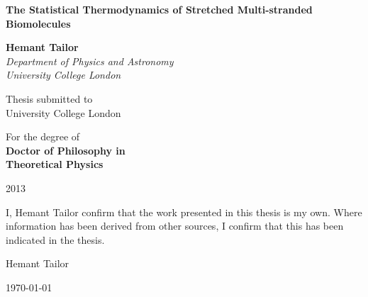 \documentclass[a4paper,12pt,titlepage]{report}
\begin{document}
\begin{titlepage}
\begin{center}
\vspace*{0.5in}
\huge \textbf{The Statistical Thermodynamics of Stretched Multi-stranded Biomolecules}\\
\vspace{0.3cm}
\par
\vspace{1.5in}
\large \textbf{Hemant Tailor} \\
\textit{Department of Physics and Astronomy \\
University College London}
\par
\vfill

\par
\vspace{0.5in}


\par
\vspace{0.5in}
Thesis submitted to\\
\large{University College London}
\par
\vspace{0.5in}
For the degree of \\
\textbf{Doctor of Philosophy in\\
Theoretical Physics}
\par
\vspace{0.5in}
2013
\vspace{0.5in}
\end{center}
\end{titlepage}

\thispagestyle{empty}
\vspace*{1in}
I, Hemant Tailor confirm that the work presented in this thesis is my own. Where information has been derived from other sources, I confirm that this has been indicated in the thesis.

\vspace*{1in}
\hspace{4in}Hemant Tailor

\hspace{4in}\today
\newpage





\tableofcontents
\setcounter{tocdepth}{1}




%




%
%


\appendix



\end{document}
